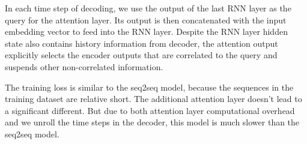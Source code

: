 In each time step of decoding, we use the output of the last RNN layer as the query for the attention layer. Its output is then concatenated with the input embedding vector to feed into the RNN layer. Despite the RNN layer hidden state also contains history information from decoder, the attention output explicitly selects the encoder outputs that are correlated to the query and suspends other non-correlated information.

The training loss is similar to the seq2seq model, because the sequences in the training dataset are relative short. The additional attention layer doesn’t lead to a significant different. But due to both attention layer computational overhead and we unroll the time steps in the decoder, this model is much slower than the seq2seq model.